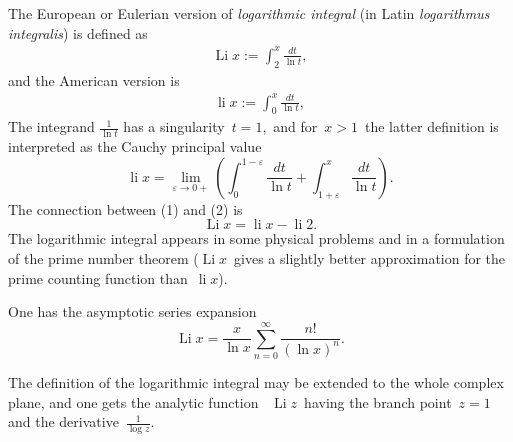 \documentclass[12pt]{article}
\newcommand{\Li}{\operatorname{Li}}
\newcommand{\li}{\operatorname{li}}
\theoremstyle{definition}
\begin{document}

The European or Eulerian version of {\em logarithmic integral} (in Latin {\em logarithmus integralis}) is defined as
\begin{align}
  \Li{x} := \int_2^x\frac{dt}{\ln{t}},
\end{align}
and the American version is
\begin{align}
  \li{x} := \int_0^x\frac{dt}{\ln{t}},
\end{align}
The integrand $\displaystyle\frac{1}{\ln{t}}$ has a singularity\, $t = 1$,\, 
and for\, $x > 1$\, the latter definition is interpreted as 
the Cauchy principal value
$$\li{x} = 
\lim_{\varepsilon\to 0+}\left(\int_0^{1-\varepsilon}\!\frac{dt}{\ln{t}}
+\int_{1+\varepsilon}^x\frac{dt}{\ln{t}}\right).$$
The connection between (1) and (2) is
$$\Li{x} = \li{x}-\li{2}.$$
The logarithmic integral appears in some physical problems 
and in a formulation of the prime number theorem ($\Li{x}$\, gives 
a slightly better approximation for the prime counting function than\, $\li{x}$).

One has the asymptotic series expansion
$$\Li{x} = \frac{x}{\ln{x}}\sum_{n=0}^\infty\frac{n!}{(\ln{x})^n}.$$

The definition of the logarithmic integral may be extended to the whole 
complex plane, and one gets the analytic function \, $\Li{z}$\, having 
the branch point\, $z = 1$\, and the derivative \,$\displaystyle\frac{1}{\log{z}}$.
\end{document}

